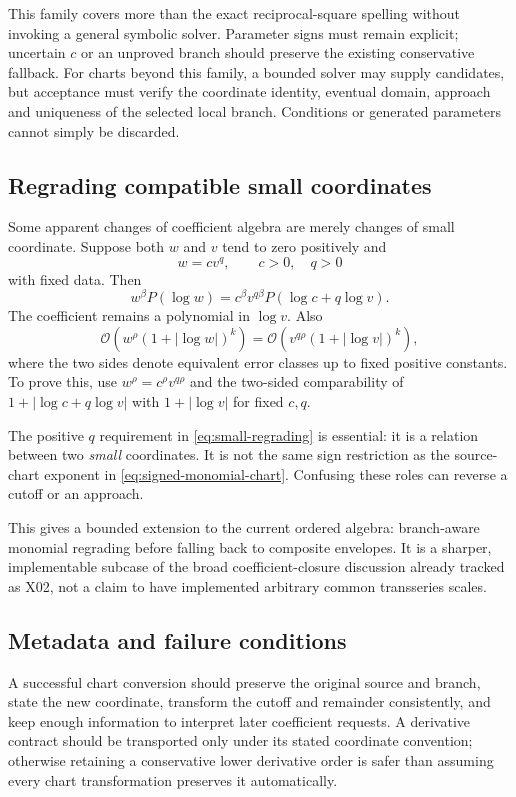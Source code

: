 \documentclass[11pt,a4paper]{article}
\newcommand{\OO}{\mathcal O}
\begin{document}
This family covers more than the exact reciprocal-square spelling without invoking a general symbolic solver. Parameter signs must remain explicit; uncertain $c$ or an unproved branch should preserve the existing conservative fallback. For charts beyond this family, a bounded solver may supply candidates, but acceptance must verify the coordinate identity, eventual domain, approach and uniqueness of the selected local branch. Conditions or generated parameters cannot simply be discarded.

\subsection{Regrading compatible small coordinates}
Some apparent changes of coefficient algebra are merely changes of small coordinate. Suppose both $w$ and $v$ tend to zero positively and
\begin{equation}
 w=c v^q,\qquad c>0,\quad q>0
 \label{eq:small-regrading}
\end{equation}
with fixed data. Then
\begin{equation}
 w^\beta P(\log w)
 =c^\beta v^{q\beta}P(\log c+q\log v).
 \label{eq:regrading-block}
\end{equation}
The coefficient remains a polynomial in $\log v$. Also
\begin{equation}
 \OO\!\left(w^\rho(1+|\log w|)^k\right)
 =\OO\!\left(v^{q\rho}(1+|\log v|)^k\right),
 \label{eq:regrading-error}
\end{equation}
where the two sides denote equivalent error classes up to fixed positive constants. To prove this, use $w^\rho=c^\rho v^{q\rho}$ and the two-sided comparability of $1+|\log c+q\log v|$ with $1+|\log v|$ for fixed $c,q$.

The positive $q$ requirement in \eqref{eq:small-regrading} is essential: it is a relation between two \emph{small} coordinates. It is not the same sign restriction as the source-chart exponent in \eqref{eq:signed-monomial-chart}. Confusing these roles can reverse a cutoff or an approach.

This gives a bounded extension to the current ordered algebra: branch-aware monomial regrading before falling back to composite envelopes. It is a sharper, implementable subcase of the broad coefficient-closure discussion already tracked as X02, not a claim to have implemented arbitrary common transseries scales.

\subsection{Metadata and failure conditions}
A successful chart conversion should preserve the original source and branch, state the new coordinate, transform the cutoff and remainder consistently, and keep enough information to interpret later coefficient requests. A derivative contract should be transported only under its stated coordinate convention; otherwise retaining a conservative lower derivative order is safer than assuming every chart transformation preserves it automatically.
\end{document}
